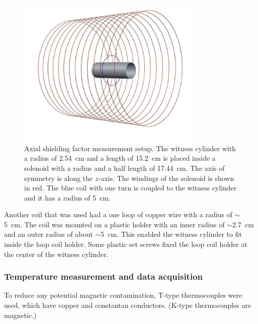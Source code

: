 \begin{figure}[h!]
\begin{center}
   \includegraphics[width=0.8\textwidth]{geometry.PNG}
    \caption{Axial shielding factor measurement setup. The witness
      cylinder with a radius of 2.54~cm and a length of 15.2~cm is placed
      inside a solenoid with a radius and a half length of
      17.44~cm. The axis of symmetry is along the $z$-axis. The
      windings of the solenoid is shown in red. The blue coil with one
      turn is coupled to the witness cylinder and it has a radius of
      5~cm.  }
    \label{fig:geometry}
    \end{center}
\end{figure}


Another coil that was used had a one loop of copper wire with a radius of $\sim$5~cm. The coil was mounted on a plastic holder with an inner radius of $\sim$2.7~cm and an outer radius of about $\sim$5~cm. This enabled the witness cylinder to fit inside the loop coil holder. Some plastic set screws fixed the loop coil holder at the center of the witness cylinder. 


\subsubsection{Temperature measurement and data acquisition}


To reduce any potential magnetic contamination, T-type thermocouples
were used, which have copper and constantan conductors.  (K-type
thermocouples are magnetic.)


